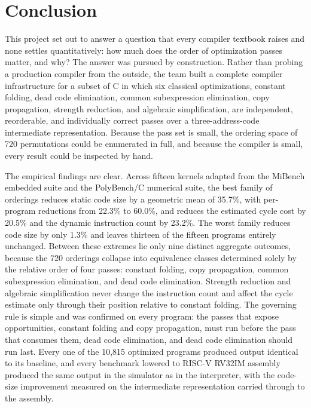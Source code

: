 \chapter{Conclusion}

This project set out to answer a question that every compiler textbook raises and none settles quantitatively: how much does the order of optimization passes matter, and why? The answer was pursued by construction. Rather than probing a production compiler from the outside, the team built a complete compiler infrastructure for a subset of C in which six classical optimizations, constant folding, dead code elimination, common subexpression elimination, copy propagation, strength reduction, and algebraic simplification, are independent, reorderable, and individually correct passes over a three-address-code intermediate representation. Because the pass set is small, the ordering space of 720 permutations could be enumerated in full, and because the compiler is small, every result could be inspected by hand.

The empirical findings are clear. Across fifteen kernels adapted from the MiBench embedded suite and the PolyBench/C numerical suite, the best family of orderings reduces static code size by a geometric mean of 35.7\%, with per-program reductions from 22.3\% to 60.0\%, and reduces the estimated cycle cost by 20.5\% and the dynamic instruction count by 23.2\%. The worst family reduces code size by only 1.3\% and leaves thirteen of the fifteen programs entirely unchanged. Between these extremes lie only nine distinct aggregate outcomes, because the 720 orderings collapse into equivalence classes determined solely by the relative order of four passes: constant folding, copy propagation, common subexpression elimination, and dead code elimination. Strength reduction and algebraic simplification never change the instruction count and affect the cycle estimate only through their position relative to constant folding. The governing rule is simple and was confirmed on every program: the passes that expose opportunities, constant folding and copy propagation, must run before the pass that consumes them, dead code elimination, and dead code elimination should run last. Every one of the 10{,}815 optimized programs produced output identical to its baseline, and every benchmark lowered to RISC-V RV32IM assembly produced the same output in the simulator as in the interpreter, with the code-size improvement measured on the intermediate representation carried through to the assembly.

